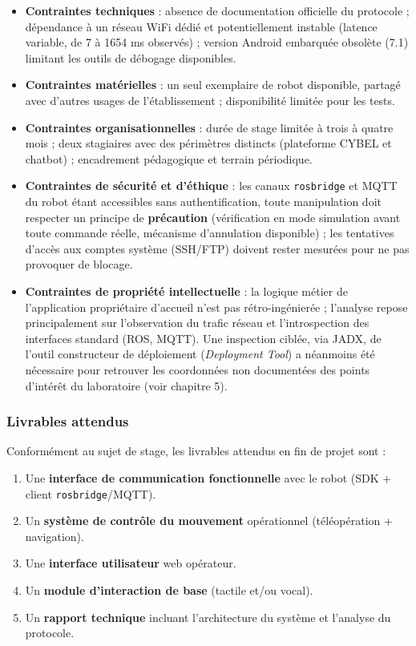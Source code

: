 \begin{itemize}
    \item \textbf{Contraintes techniques} : absence de documentation officielle
    du protocole ; dépendance à un réseau WiFi dédié et potentiellement instable
    (latence variable, de 7 à 1654 ms observés) ; version Android embarquée
    obsolète (7.1) limitant les outils de débogage disponibles.

    \item \textbf{Contraintes matérielles} : un seul exemplaire de robot
    disponible, partagé avec d'autres usages de l'établissement ; disponibilité
    limitée pour les tests.

    \item \textbf{Contraintes organisationnelles} : durée de stage limitée à
    trois à quatre mois ; deux stagiaires avec des périmètres distincts
    (plateforme CYBEL et chatbot) ; encadrement pédagogique et terrain
    périodique.

    \item \textbf{Contraintes de sécurité et d'éthique} : les canaux
    \texttt{rosbridge} et MQTT du robot étant accessibles sans authentification,
    toute manipulation doit respecter un principe de \textbf{précaution}
    (vérification en mode simulation avant toute commande réelle, mécanisme
    d'annulation disponible) ; les tentatives d'accès aux comptes système (SSH/FTP)
    doivent rester mesurées pour ne pas provoquer de blocage.

    \item \textbf{Contraintes de propriété intellectuelle} : la logique métier
    de l'application propriétaire d'accueil n'est pas rétro-ingénierée ;
    l'analyse repose principalement sur l'observation du trafic réseau et
    l'introspection des interfaces standard (ROS, MQTT). Une inspection
    ciblée, via JADX, de l'outil constructeur de déploiement (\textit{Deployment
    Tool}) a néanmoins été nécessaire pour retrouver les coordonnées non
    documentées des points d'intérêt du laboratoire (voir chapitre 5).
\end{itemize}

\subsubsection{Livrables attendus}

Conformément au sujet de stage, les livrables attendus en fin de projet sont :

\begin{enumerate}
    \item Une \textbf{interface de communication fonctionnelle} avec le robot
    (SDK + client \texttt{rosbridge}/MQTT).
    \item Un \textbf{système de contrôle du mouvement} opérationnel
    (téléopération + navigation).
    \item Une \textbf{interface utilisateur} web opérateur.
    \item Un \textbf{module d'interaction de base} (tactile et/ou vocal).
    \item Un \textbf{rapport technique} incluant l'architecture du système et
    l'analyse du protocole.
\end{enumerate}

